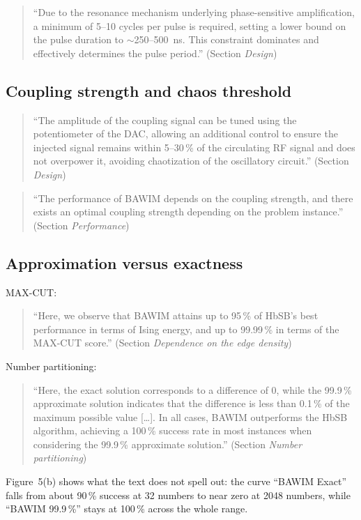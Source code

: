 \begin{quote}\QM
``Due to the resonance mechanism underlying phase-sensitive amplification,
a minimum of 5--10 cycles per pulse is required, setting a lower bound on
the pulse duration to $\sim$250--500~ns. This constraint dominates and
effectively determines the pulse period.'' (Section \emph{Design})
\end{quote}

\subsection{Coupling strength and chaos threshold}

\begin{quote}\QM
``The amplitude of the coupling signal can be tuned using the potentiometer
of the DAC, allowing an additional control to ensure the injected signal
remains within 5--30\,\% of the circulating RF signal and does not overpower
it, avoiding chaotization of the oscillatory circuit.''
(Section \emph{Design})
\end{quote}
\begin{quote}\QM
``The performance of BAWIM depends on the coupling strength, and there
exists an optimal coupling strength depending on the problem instance.''
(Section \emph{Performance})
\end{quote}

\subsection{Approximation versus exactness}

MAX-CUT:
\begin{quote}\QM
``Here, we observe that BAWIM attains up to 95\,\% of HbSB's best
performance in terms of Ising energy, and up to 99.99\,\% in terms of the
MAX-CUT score.'' (Section \emph{Dependence on the edge density})
\end{quote}
Number partitioning:
\begin{quote}\QM
``Here, the exact solution corresponds to a difference of 0, while the
99.9\,\% approximate solution indicates that the difference is less than
0.1\,\% of the maximum possible value [\ldots]. In all cases, BAWIM
outperforms the HbSB algorithm, achieving a 100\,\% success rate in most
instances when considering the 99.9\,\% approximate solution.''
(Section \emph{Number partitioning})
\end{quote}
Figure~5(b) shows what the text does not spell out: the curve ``BAWIM
Exact'' falls from about 90\,\% success at 32 numbers to near zero at
2048 numbers, while ``BAWIM 99.9\,\%'' stays at 100\,\% across the whole
range.

